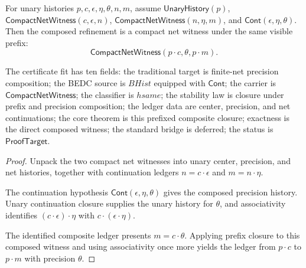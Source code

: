 \begin{theorem}
\label{thm:compact-net-witness-prefixed-composite-closed}
For unary histories $p,c,\epsilon,\eta,\theta,n,m$, assume
$\mathsf{UnaryHistory}(p)$,
$\mathsf{CompactNetWitness}(c,\epsilon,n)$,
$\mathsf{CompactNetWitness}(n,\eta,m)$, and
$\mathsf{Cont}(\epsilon,\eta,\theta)$. Then the composed refinement is a
compact net witness under the same visible prefix:
$$
\mathsf{CompactNetWitness}(p \cdot c,\theta,p \cdot m).
$$

The certificate fit has ten fields: the traditional target is finite-net
precision composition; the BEDC source is $BHist$ equipped with $\mathsf{Cont}$;
the carrier is $\mathsf{CompactNetWitness}$; the classifier is $hsame$; the
stability law is closure under prefix and precision composition; the ledger
data are center, precision, and net continuations; the core theorem is this
prefixed composite closure; exactness is the direct composed witness; the
standard bridge is deferred; the status is $\mathsf{ProofTarget}$.
\end{theorem}
\begin{proof}
Unpack the two compact net witnesses into unary center, precision, and net
histories, together with continuation ledgers $n=c\cdot\epsilon$ and
$m=n\cdot\eta$.

The continuation hypothesis $\mathsf{Cont}(\epsilon,\eta,\theta)$ gives the
composed precision history. Unary continuation closure supplies the unary
history for $\theta$, and associativity identifies
$(c\cdot\epsilon)\cdot\eta$ with $c\cdot(\epsilon\cdot\eta)$.

The identified composite ledger presents $m=c\cdot\theta$. Applying prefix
closure to this composed witness and using associativity once more yields the
ledger from $p\cdot c$ to $p\cdot m$ with precision $\theta$.
\end{proof}

